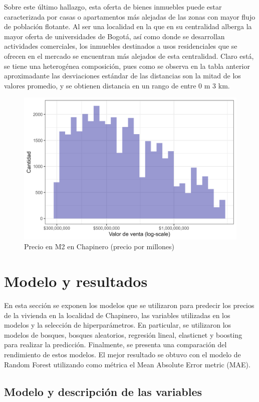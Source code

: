 \documentclass[
  11pt,
  letterpaper,
]{article}
\begin{document}
Sobre este último hallazgo, esta oferta de bienes inmuebles puede estar caracterizada por casas o apartamentos más alejadas de las zonas con mayor flujo de población flotante. Al ser una localidad en la que en su centralidad alberga la mayor oferta de universidades de Bogotá, así como donde se desarrollan actividades comerciales, los inmuebles destinados a usos residenciales que se ofrecen en el mercado se encuentran más alejados de esta centralidad. Claro está, se tiene una heterogénea composición, pues como se observa en la tabla anterior aproximadante las desviaciones estándar de las distancias son la mitad de los valores promedio, y se obtienen distancia en un rango de entre 0 m 3 km.

\begin{figure}[H]
\includegraphics[width=0.7\linewidth]{../views/g2} \caption{Precio en M2 en Chapinero (precio por millones)}\label{fig:grap01}
\end{figure}

\hypertarget{modelo-y-resultados}{%
\section{Modelo y resultados}\label{modelo-y-resultados}}

En esta sección se exponen los modelos que se utilizaron para predecir los precios de la vivienda en la localidad de Chapinero, las variables utilizadas en los modelos y la selección de hiperparámetros. En particular, se utilizaron los modelos de bosques, bosques aleatorios, regresión lineal, elasticnet y boosting para realizar la predicción. Finalmente, se presenta una comparación del rendimiento de estos modelos. El mejor resultado se obtuvo con el modelo de Random Forest utilizando como métrica el Mean Absolute Error metric (MAE).

\hypertarget{modelo-y-descripciuxf3n-de-las-variables}{%
\subsection{Modelo y descripción de las variables}\label{modelo-y-descripciuxf3n-de-las-variables}}
\end{document}

